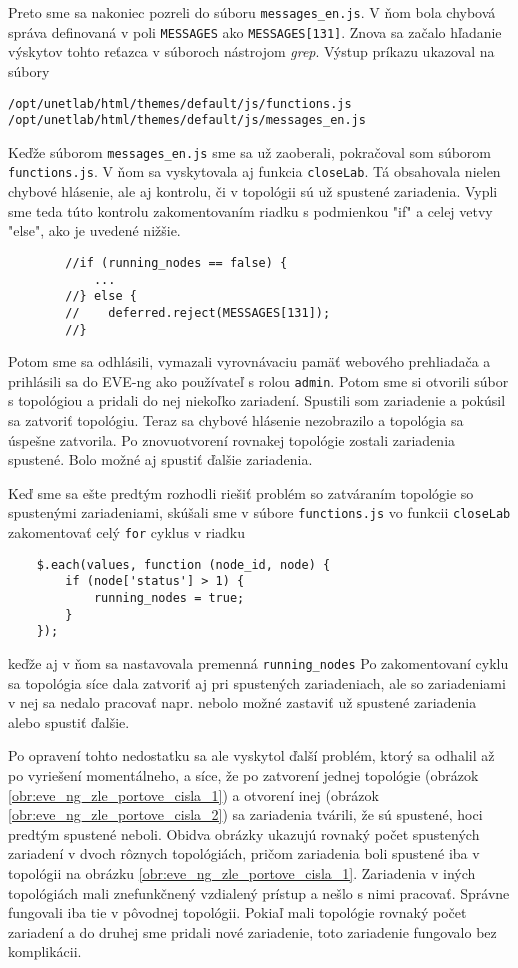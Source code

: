 Preto sme sa nakoniec pozreli do súboru \texttt{messages\_en.js}. V ňom bola chybová správa definovaná v poli \texttt{MESSAGES} ako \texttt{MESSAGES[131]}. Znova sa začalo hľadanie výskytov tohto reťazca v súboroch nástrojom \emph{grep}. Výstup príkazu ukazoval na súbory
\begin{verbatim}
/opt/unetlab/html/themes/default/js/functions.js
/opt/unetlab/html/themes/default/js/messages_en.js
\end{verbatim}

Keďže súborom \texttt{messages\_en.js} sme sa už zaoberali, pokračoval som súborom \texttt{functions.js}. V ňom sa vyskytovala aj funkcia \texttt{closeLab}. Tá obsahovala nielen chybové hlásenie, ale aj kontrolu, či v topológii sú už spustené zariadenia. Vypli sme teda túto kontrolu zakomentovaním riadku s podmienkou "if" a celej vetvy "else", ako je uvedené nižšie.
\begin{verbatim}
        //if (running_nodes == false) {
            ...
        //} else {
        //    deferred.reject(MESSAGES[131]);
        //}
\end{verbatim}

Potom sme sa odhlásili, vymazali vyrovnávaciu pamäť webového prehliadača a prihlásili sa do EVE-ng ako používateľ s rolou \texttt{admin}. Potom sme si otvorili súbor s topológiou a pridali do nej niekoľko zariadení. Spustili som zariadenie a pokúsil sa zatvoriť topológiu. Teraz sa chybové hlásenie nezobrazilo a topológia sa úspešne zatvorila. Po znovuotvorení rovnakej topológie zostali zariadenia spustené. Bolo možné aj spustiť ďalšie zariadenia.

Keď sme sa ešte predtým rozhodli riešiť problém so zatváraním topológie so spustenými zariadeniami, skúšali sme v súbore \texttt{functions.js} vo funkcii \texttt{closeLab} zakomentovať celý \texttt{for} cyklus v riadku 
\begin{verbatim}
    $.each(values, function (node_id, node) {
        if (node['status'] > 1) {
            running_nodes = true;
        }
    });
\end{verbatim}
keďže aj v ňom sa nastavovala premenná \texttt{running\_nodes} Po zakomentovaní cyklu sa topológia síce dala zatvoriť aj pri spustených zariadeniach, ale so zariadeniami v nej sa nedalo pracovať napr. nebolo možné zastaviť už spustené zariadenia alebo spustiť ďalšie.

Po opravení tohto nedostatku sa ale vyskytol ďalší problém, ktorý sa odhalil až po vyriešení momentálneho, a síce, že po zatvorení jednej topológie (obrázok \ref{obr:eve_ng_zle_portove_cisla_1}) a otvorení inej (obrázok \ref{obr:eve_ng_zle_portove_cisla_2}) sa zariadenia tvárili, že sú spustené, hoci predtým spustené neboli. Obidva obrázky ukazujú rovnaký počet spustených zariadení v dvoch rôznych topológiách, pričom zariadenia boli spustené iba v topológii na obrázku \ref{obr:eve_ng_zle_portove_cisla_1}. Zariadenia v iných topológiách mali znefunkčnený vzdialený prístup a nešlo s nimi pracovať. Správne fungovali iba tie v pôvodnej topológii. Pokiaľ mali topológie rovnaký počet zariadení a do druhej sme pridali nové zariadenie, toto zariadenie fungovalo bez komplikácii.

